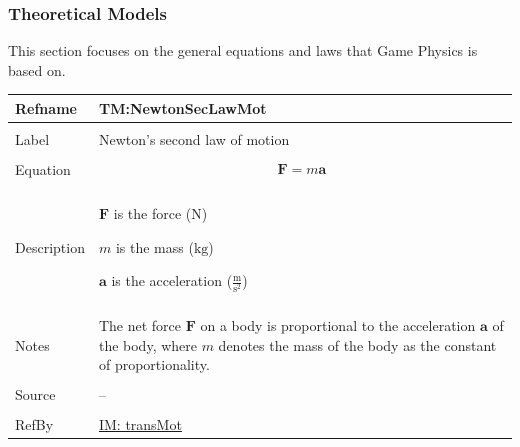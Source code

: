 \documentclass[12pt]{article}
\begin{document}
\subsubsection{Theoretical Models}
\label{Sec:TMs}
This section focuses on the general equations and laws that Game Physics is based on.

\vspace{\baselineskip}
\noindent
\begin{minipage}{\textwidth}
\begin{tabular}{>{\raggedright}p{}>{\raggedright\arraybackslash}p{}}
\toprule \textbf{Refname} & \textbf{TM:NewtonSecLawMot}
\label{TM:NewtonSecLawMot}
\\ \midrule \\
Label & Newton's second law of motion
        
\\ \midrule \\
Equation & \begin{displaymath}
           \mathbf{F}=m \mathbf{a}
           \end{displaymath}
\\ \midrule \\
Description & \begin{symbDescription}
              \item{$\mathbf{F}$ is the force (${\text{N}}$)}
              \item{$m$ is the mass (${\text{kg}}$)}
              \item{$\mathbf{a}$ is the acceleration ($\frac{\text{m}}{\text{s}^{2}}$)}
              \end{symbDescription}
\\ \midrule \\
Notes & The net force $\mathbf{F}$ on a body is proportional to the acceleration $\mathbf{a}$ of the body, where $m$ denotes the mass of the body as the constant of proportionality.
        
\\ \midrule \\
Source & --
         
\\ \midrule \\
RefBy & \hyperref[IM:transMot]{IM: transMot}
        
\\ \bottomrule
\end{tabular}
\end{minipage}
\vspace{\baselineskip}
\end{document}
